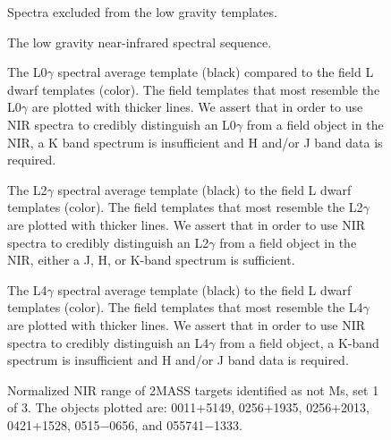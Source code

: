 \documentclass[12pt,preprint]{aastex}
\begin{document}
\begin{figure}
	\caption{Spectra excluded from the low gravity templates.}
	\label{fig:lowg_excluded}
\end{figure}

\begin{figure}
	\caption{The low gravity near-infrared spectral sequence.}
	\label{fig:lg_sequence}
\end{figure}
	

\begin{figure}
	\caption{The L0$\gamma$ spectral average template (black) compared to the field L dwarf templates (color). The field templates that most resemble the L0$\gamma$ are plotted with thicker lines. We assert that in order to use NIR spectra to credibly distinguish an L0$\gamma$ from a field object in the NIR, a K band spectrum is insufficient and H and/or J band data is required.}
	\label{fig:L0lg-field}
\end{figure}

\begin{figure}
	\caption{The L2$\gamma$ spectral average template (black) to the field L dwarf templates (color). The field templates that most resemble the L2$\gamma$ are plotted with thicker lines. We assert that in order to use NIR spectra to credibly distinguish an L2$\gamma$ from a field object in the NIR, either a J, H, or K-band spectrum is sufficient.}
	\label{fig:L2lg-field}
\end{figure}

\begin{figure}
	\caption{The L4$\gamma$ spectral average template (black) to the field L dwarf templates (color). The field templates that most resemble the L4$\gamma$ are plotted with thicker lines. We assert that in order to use NIR spectra to credibly distinguish an L4$\gamma$ from a field object, a K-band spectrum is insufficient and H and/or J band data is required.}
	\label{fig:L4lg-field}
\end{figure}


\begin{figure}
	\caption{Normalized NIR range of 2MASS targets identified as not Ms, set 1 of 3. The objects plotted are: 0011+5149, 0256+1935, 0256+2013, 0421+1528, 0515$-$0656, and 055741$-$1333.}
	\label{fig:notMs_1}
\end{figure}
\end{document}
